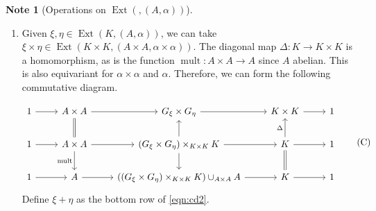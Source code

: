 \documentclass[10pt,letterpaper,cm]{nupset}
\theoremstyle{definition}
\newtheorem{note}[definition]{Note}
\theoremstyle{theorem}
\theoremstyle{remark}
\newcommand{\1}{\mathbf{1}}
\newcommand{\0}{\vec 0}
\DeclareMathOperator{\mult}{mult}
\DeclareMathOperator{\ext}{Ext}
\begin{document}
\begin{note}[Operations on $\ext(, (A, \alpha))$]
\begin{enumerate}[label=(\arabic*)]
\begin{proof}
Finally, observe that 
\begin{align*}
\ker(G\ltimes_{\beta \circ q} B \twoheadrightarrow K) & = \left\{(g, b) : q(g) =e\right\} 
\\ & = \left\{(g, b) : g \in A\right\}
\\ &  \geq A\times \left\{e\right\} \cong A.\end{align*}
\end{proof}
Now, let $G_{\psi_{\ast}\xi}$ denote $G \cup_A B$, which equals $\faktor{G\ltimes_{\beta \circ q} B}{(i\times \psi)(A)}.$ 
We have obtained a commutative diagram.
\[ \label{eqn:cd}
\begin{tikzcd}
1 \arrow[r] & A \arrow[d, hook] \arrow[r] & G \arrow[d, hook] \arrow[r] & K \arrow[d, equal] \arrow[r] & 1 \\
1 \arrow[r] & A\times B \arrow[r, "i"] \arrow[d, two heads] & G \ltimes_{\beta \circ q} B \arrow[r, "q"] \arrow[d, two heads] & K \arrow[r] \arrow[d, equal] & 1 \\
1 \arrow[r] & \underbrace{B}_{\faktor{A\times B}{(i\times \psi)(A)}} \arrow[r] & G_{\psi_{\ast}\xi} \arrow[r] & K \arrow[r] & 1
\end{tikzcd}, \tag{B}
\]
where $B \cong \faktor{A\times B}{(i\times \psi)(A)}$ via the mapping $b \mapsto \left[(e, b)\right]$. 

Let $\psi_{\ast}$ denote the induced map $G \to G_{\psi_{\ast} \xi}$. Define the extension $\psi_{\ast}\xi$ as the bottom row of \eqref{eqn:cd}.

\item Given $\xi, \eta \in \ext(K, (A, \alpha))$, we can take $\xi \times \eta \in \ext(K \times K, (A\times A, \alpha \times \alpha))$. The diagonal map $\Delta : K \to K \times K$ is a homomorphism, as is the function $\mult: A \times A \to A$ since $A$ abelian. This is also equivariant for $\alpha \times \alpha$ and $\alpha$.
Therefore, we can form the following commutative diagram.

\[ \label{eqn:cd2}
\begin{tikzcd}
1 \arrow[r] & A\times A \arrow[r] & G_{\xi}\times G_{\eta} \arrow[r] & K\times K \arrow[r] & 1 \\
1 \arrow[r] & A\times A \arrow[r] \arrow[d, "\mult"'] \arrow[u, equal] & \left(G_{\xi} \times G_{\eta}\right) \times_{K\times K} K \arrow[r] \arrow[u] \arrow[d] & K \arrow[r] \arrow[u, "\Delta"] \arrow[d, equal] & 1 \\
1 \arrow[r] & A \arrow[r] & \left(\left(G_{\xi} \times G_{\eta}\right) \times_{K\times K} K\right) \cup_{A\times A} A \arrow[r] & K \arrow[r] & 1
\end{tikzcd} \tag{C}
\]
Define $\xi + \eta$ as the bottom row of \eqref{eqn:cd2}.
\end{enumerate}
\end{note}
\end{document}
